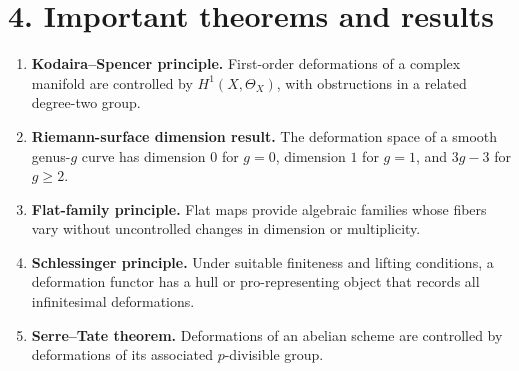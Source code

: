 \section*{4. Important theorems and results}
\begin{enumerate}[leftmargin=*,itemsep=0.35em]

\item \textbf{Kodaira--Spencer principle.} First-order deformations of a complex manifold are controlled by $H^1(X,\Theta_X)$, with obstructions in a related degree-two group. \cite{deformation_theory_ref2}

\item \textbf{Riemann-surface dimension result.} The deformation space of a smooth genus-$g$ curve has dimension $0$ for $g=0$, dimension $1$ for $g=1$, and $3g-3$ for $g\geq2$. \cite{deformation_theory_ref4}

\item \textbf{Flat-family principle.} Flat maps provide algebraic families whose fibers vary without uncontrolled changes in dimension or multiplicity. \cite{deformation_theory_ref1}

\item \textbf{Schlessinger principle.} Under suitable finiteness and lifting conditions, a deformation functor has a hull or pro-representing object that records all infinitesimal deformations. \cite{deformation_theory_ref5}

\item \textbf{Serre--Tate theorem.} Deformations of an abelian scheme are controlled by deformations of its associated $p$-divisible group. \cite{deformation_theory_ref6}
\end{enumerate}

\theoryapplications
{}

